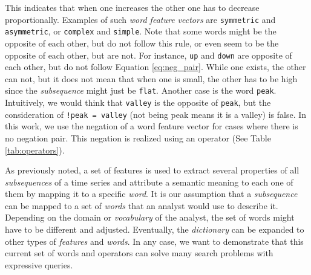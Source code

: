 This indicates that when one increases the other one has to decrease proportionally. Examples of such \textit{word feature vectors} are \texttt{symmetric} and \texttt{asymmetric}, or \texttt{complex} and \texttt{simple}. Note that some words might be the opposite of each other, but do not follow this rule, or even seem to be the opposite of each other, but are not. For instance, \texttt{up} and \texttt{down} are opposite of each other, but do not follow Equation \ref{eq:neg_pair}. While one exists, the other can not, but it does not mean that when one is small, the other has to be high since the \textit{subsequence} might just be \texttt{flat}. Another case is the word \texttt{peak}. Intuitively, we would think that \texttt{valley} is the opposite of \texttt{peak}, but the consideration of \texttt{!peak = valley} (not being peak means it is a valley) is false. In this work, we use the negation of a word feature vector for cases where there is no negation pair. This negation is realized using an operator (See Table \ref{tab:operators}).
\par
As previously noted, a set of features is used to extract several properties of all \textit{subsequences} of a time series and attribute a semantic meaning to each one of them by mapping it to a specific \textit{word}. It is our assumption that a \textit{subsequence} can be mapped to a set of \textit{words} that an analyst would use to describe it. Depending on the domain or \textit{vocabulary} of the analyst, the set of words might have to be different and adjusted. Eventually, the \textit{dictionary} can be expanded to other types of \textit{features} and \textit{words}. In any case, we want to demonstrate that this current set of words and operators can solve many search problems with expressive queries.

